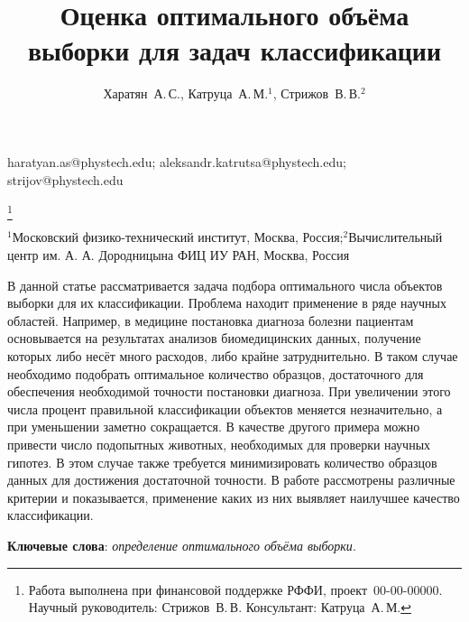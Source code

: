 \documentclass[12pt,twoside]{article}
\begin{document}
\title
    {Оценка оптимального объёма выборки для задач классификации}
\author
    {Харатян~А.\,С., Катруца~А.\,М.$^1$, Стрижов~В.\,В.$^2$} %
\email
	{haratyan.as@phystech.edu; aleksandr.katrutsa@phystech.edu; strijov@phystech.edu}

\thanks
    {Работа выполнена при финансовой поддержке РФФИ, проект \No\,00-00-00000.
     Научный руководитель:  Стрижов~В.\,В.
     Консультант:  Катруца~А.\,М.}

\organization
    {$^1$Московский физико-технический институт, Москва, Россия;$^2$Вычислительный центр им. А. А. Дородницына ФИЦ ИУ РАН, Москва, Россия}
    
\abstract
	{В данной статье рассматривается задача подбора оптимального числа объектов выборки для их классификации. Проблема находит применение в ряде научных областей. Например, в медицине постановка диагноза болезни пациентам основывается на результатах анализов биомедицинских данных, получение которых  либо несёт много расходов, либо крайне затруднительно. В таком случае необходимо подобрать оптимальное количество образцов, достаточного для обеспечения необходимой точности постановки диагноза. При увеличении этого числа процент правильной классификации объектов меняется незначительно, а при уменьшении заметно сокращается. В качестве другого примера можно привести число подопытных животных, необходимых для проверки научных гипотез. В этом случае также требуется минимизировать количество образцов данных для достижения достаточной точности. В работе рассмотрены различные критерии и показывается, применение каких из них выявляет наилучшее качество классификации.

\bigskip
\noindent
\textbf{Ключевые слова}: \emph {определение оптимального объёма выборки}.

}



\maketitle
\end{document}
